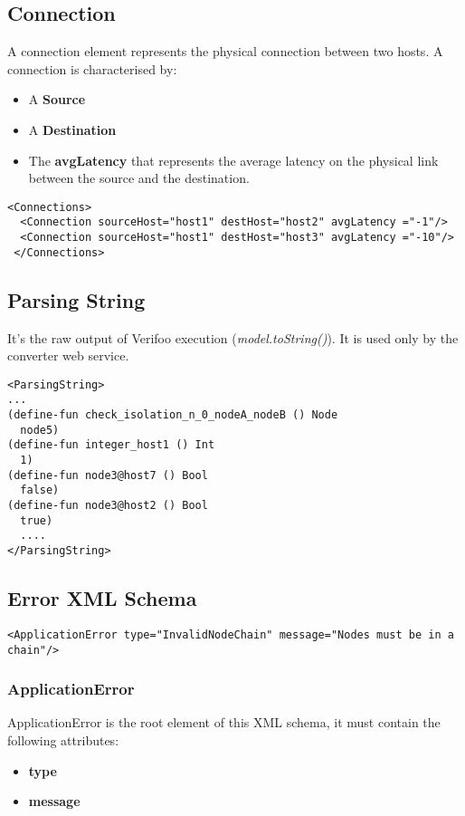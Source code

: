 \documentclass[a4paper,11pt]{article}
\begin{document}
\subsection*{Connection}
A connection element represents the physical connection between two hosts. A connection is characterised by:
\begin{itemize}
    \item A \textbf{Source}
    \item A \textbf{Destination}
    \item The \textbf{avgLatency} that represents the average latency on the physical link between the source and the destination.
\end{itemize}
\begin{lstlisting}[label={list:nineteenth},caption=Connections Example]
 <Connections>
  <Connection sourceHost="host1" destHost="host2" avgLatency ="-1"/>
  <Connection sourceHost="host1" destHost="host3" avgLatency ="-10"/>
 </Connections>
\end{lstlisting}
\subsection*{Parsing String}
It's the raw output of Verifoo execution (\textit{model.toString()}).
It is used only by the converter web service.
\begin{lstlisting}[label={list:twentieth},caption=An extract of ParsingString Example]
<ParsingString>
...
(define-fun check_isolation_n_0_nodeA_nodeB () Node
  node5)
(define-fun integer_host1 () Int
  1)
(define-fun node3@host7 () Bool
  false)
(define-fun node3@host2 () Bool
  true)
  ....
</ParsingString>
\end{lstlisting}
\newpage
\subsection{Error XML Schema}
\begin{lstlisting}[label={list:
twenty-first},caption=Error XML Example]
<ApplicationError type="InvalidNodeChain" message="Nodes must be in a chain"/>
\end{lstlisting}
\subsubsection*{ApplicationError}
ApplicationError is the root element of this XML schema, it must contain the following attributes:
\begin{itemize}
    \item \textbf{type}
    \item \textbf{message}
\end{itemize}
\end{document}
